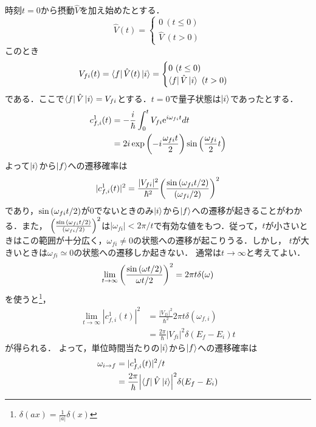 \documentclass{report}
\begin{document}
  時刻$t=0$から摂動$\hat{V}$を加え始めたとする．
  \begin{equation}
    \hat{V}(t)=
    \begin{cases}
      0\ (t\le0)\\
      \hat{V}\ (t>0)
    \end{cases}
  \end{equation}
  このとき
  \begin{equation}
    V_{fi}(t)=\bra{f}\hat{V}(t)\ket{i}=
    \begin{cases}
      0\ (t\le 0)\\
      \bra{f}\hat{V}\ket{i}\ (t>0)
    \end{cases}
  \end{equation}
  である．ここで$\bra{f}\hat{V}\ket{i}=V_{fi}$とする．$t=0$で量子状態は$\ket{i}$であったとする．
  \begin{align}
    c_{f,i}^1(t)&=-\frac{i}{\hbar}\int_{0}^{t}V_{fi}\mathrm{e}^{i\omega_{fi}t}dt\\
    &=2i\exp\qty(-i\frac{\omega_{fi}t}{2})\sin\qty(\frac{\omega_{fi}}{2}t)
  \end{align}
  よって$\ket{i}$から$\ket{f}$への遷移確率は
  \begin{equation}
    |c_{f,i}^1(t)|^2=\frac{|V_{fi}|^2}{\hbar^2}\qty(\frac{\sin\qty(\omega_{fi}t/2)}{\qty(\omega_{fi}/2)})^2
  \end{equation}
  であり，$\sin\qty(\omega_{fi}t/2)$が0でないときのみ$\ket{i}$から$\ket{f}$への遷移が起きることがわかる．また，
  $\qty(\frac{\sin\qty(\omega_{fi}t/2)}{\qty(\omega_{fi}/2)})^2$は$|\omega_{fi}|<2\pi/t$で有効な値をもつ．従って，$t$が小さいときはこの範囲が十分広く，$\omega_{fi}\ne0$の状態への遷移が起こりうる．しかし，
  $t$が大きいときは$\omega_{fi}\simeq0$の状態への遷移しか起きない．
  通常は$t\to\infty$と考えてよい．
  \begin{equation}
    \lim_{t\to\infty}\qty(\frac{\sin\qty(\omega t/2)}{\omega t/2})^2=2\pi t\delta(\omega)
  \end{equation}
  を使うと\footnote{$\delta(ax)=\frac{1}{|a|}\delta(x)$}，
  \begin{align}
    \lim_{t\to\infty}|c_{f,i}^1(t)|^2&=\frac{|V_{fi}|^2}{\hbar^2}2\pi t\delta(\omega_{f,i})\\
    &=\frac{2\pi}{\hbar}|V_{fi}|^2\delta(E_f-E_i)t
  \end{align}
  が得られる．
  よって，単位時間当たりの$\ket{i}$から$\ket{f}$への遷移確率は
  \begin{align}
    \omega_{i\to f}&=|c_{f,i}^1(t)|^2/t\\
    &=\frac{2\pi}{\hbar}\qty|\bra{f}\hat{V}\ket{i}|^2\delta(E_f-E_i)
  \end{align}
\end{document}
